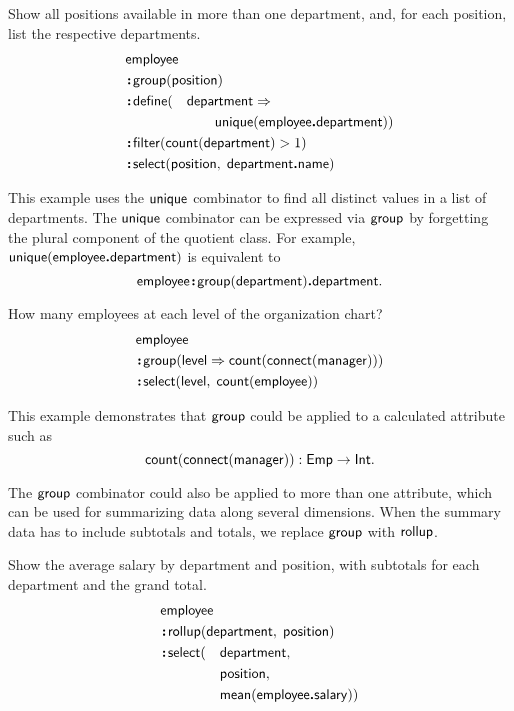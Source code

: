 \begin{example}
    \label{ex:unique-department}
    Show all positions available in more than one department, and, for each
    position, list the respective departments.
    \begin{alignat*}{2}
        & \Employee\hidewidth &&  \\
        & \Apply\Group(\Position)\hidewidth && \\
        & \Apply\Define(&& \Department\As \\
        & && \qquad \Unique(\Employee\To\Department)) \\
        & \Apply\Filter(\Count(\Department) > 1)\hidewidth && \\
        & \Apply\Select(\Position,\; \Department\To\Name)\hidewidth &&
    \end{alignat*}
\end{example}

This example uses the $\textup{\textsf{unique}}$ combinator to find all distinct values in a
list of departments.  The $\textup{\textsf{unique}}$ combinator can be expressed via $\textup{\textsf{group}}$ by
forgetting the plural component of the quotient class.  For example,
$\textup{\textsf{unique}}(\textup{\textsf{employee}}\boldsymbol{.}\textup{\textsf{department}})$ is equivalent to
\begin{equation*}
    \textup{\textsf{employee}}\!\boldsymbol{:}\!\textup{\textsf{group}}(\textup{\textsf{department}})\boldsymbol{.}\textup{\textsf{department}}.
\end{equation*}

\begin{example}
    How many employees at each level of the organization chart?
    \begin{align*}
        & \textup{\textsf{employee}} \\
        & \!\boldsymbol{:}\!\textup{\textsf{group}}(\textup{\textsf{level}}\Rightarrow\textup{\textsf{count}}(\textup{\textsf{connect}}(\textup{\textsf{manager}}))) \\
        & \!\boldsymbol{:}\!\textup{\textsf{select}}(\textup{\textsf{level}},\; \textup{\textsf{count}}(\textup{\textsf{employee}}))
    \end{align*}
\end{example}

This example demonstrates that $\textup{\textsf{group}}$ could be applied to a calculated
attribute such as
\begin{equation*}
    \textup{\textsf{count}}(\textup{\textsf{connect}}(\textup{\textsf{manager}})) : \textup{\textsf{Emp}} \to \textup{\textsf{Int}}.
\end{equation*}

The $\textup{\textsf{group}}$ combinator could also be applied to more than one attribute, which
can be used for summarizing data along several dimensions.  When the summary
data has to include subtotals and totals, we replace $\textup{\textsf{group}}$ with $\textup{\textsf{rollup}}$.

\begin{example}
    Show the average salary by department and position, with subtotals for each
    department and the grand total.
    \begin{alignat*}{2}
        & \Employee\hidewidth && \\
        & \Apply\Rollup(\Department,\; \Position)\hidewidth && \\
        & \Apply\Select(&& \Department, \\
        & && \Position, \\
        & && \Mean(\Employee\To\Salary))
    \end{alignat*}
\end{example}

